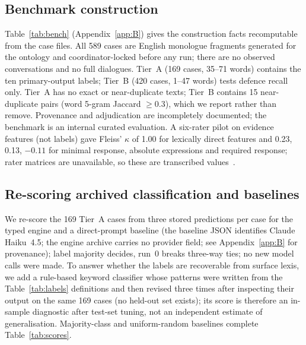 \documentclass[runningheads]{llncs}
\begin{document}
\subsection{Benchmark construction}
Table~\ref{tab:bench} (Appendix~\ref{app:B}) gives the construction facts recomputable from the case files. All 589 cases are English monologue fragments generated for the ontology and coordinator-locked before any run; there are no observed conversations and no full dialogues. Tier~A (169 cases, 35--71 words) contains the ten primary-output labels; Tier~B (420 cases, 1--47 words) tests defence recall only. Tier~A has no exact or near-duplicate texts; Tier~B contains 15 near-duplicate pairs (word 5-gram Jaccard $\ge 0.3$), which we report rather than remove. Provenance and adjudication are incompletely documented; the benchmark is an internal curated evaluation. A six-rater pilot on evidence features (not labels) gave Fleiss' $\kappa$ of 1.00 for lexically direct features and 0.23, 0.13, $-0.11$ for minimal response, absolute expressions and required response; rater matrices are unavailable, so these are transcribed values~\cite{krippendorff2004reliability,passonneau2006masi}.


\subsection{Re-scoring archived classification and baselines}
We re-score the 169 Tier~A cases from three stored predictions per case for the typed engine and a direct-prompt baseline (the baseline JSON identifies Claude Haiku~4.5; the engine archive carries no provider field; see Appendix~\ref{app:B} for provenance); label majority decides, run~0 breaks three-way ties; no new model calls were made. To answer whether the labels are recoverable from surface lexis, we add a rule-based keyword classifier whose patterns were written from the Table~\ref{tab:labels} definitions and then revised three times after inspecting their output on the same 169 cases (no held-out set exists); its score is therefore an in-sample diagnostic after test-set tuning, not an independent estimate of generalisation. Majority-class and uniform-random baselines complete Table~\ref{tab:scores}.
\end{document}
